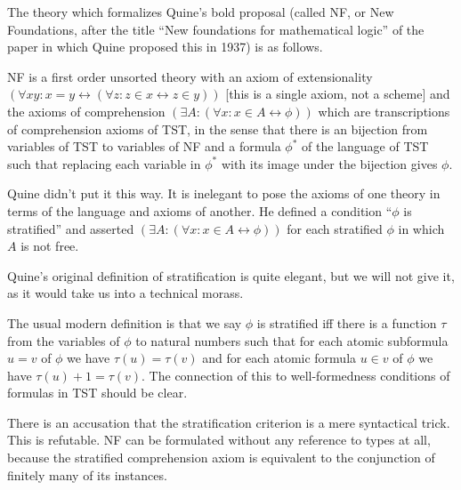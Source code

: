 \documentclass{slides}
\begin{document}
\begin{slide}

The theory which formalizes Quine's bold proposal (called NF, or New Foundations, after the title ``New foundations for mathematical logic'' of the paper in which Quine proposed this in 1937) is as follows.

NF is a first order unsorted theory with an axiom of extensionality \newline $(\forall xy:x=y \leftrightarrow (\forall z:z \in x \leftrightarrow z \in y))$ [this is a single axiom, not a scheme]
and the axioms of comprehension $(\exists A:(\forall x:x \in A \leftrightarrow \phi))$ which are transcriptions of comprehension axioms of TST, in the sense that there is an bijection from variables of TST to variables of NF
and a formula $\phi^*$ of the language of TST such that replacing each variable in $\phi^*$ with its image under the bijection gives $\phi$.

Quine didn't put it this way.  It is inelegant to pose the axioms of one theory in terms of the language and axioms of another.  He defined a condition ``$\phi$ is stratified'' and asserted $(\exists A:(\forall x:x \in A \leftrightarrow \phi))$ for each stratified $\phi$ in which $A$ is not free. 


\end{slide}

\begin{slide}

Quine's original definition of stratification is quite elegant, but we will not give it, as it would take us into a technical morass.

The usual modern definition is that we say $\phi$ is stratified iff there is a function $\tau$ from the variables of $\phi$ to natural numbers such that for each atomic subformula $u = v$ of $\phi$ we have $\tau(u)=\tau(v)$ and for each atomic formula $u \in v$ of $\phi$ we have $\tau(u)+1 = \tau(v)$.  The connection of this to well-formedness conditions of formulas in TST should be clear.

There is an accusation that the stratification criterion is a mere syntactical trick.  This is refutable.  NF can be formulated without any reference to types at all, because the stratified comprehension axiom is equivalent to the conjunction of finitely many of its instances.

\end{slide}
\end{document}
